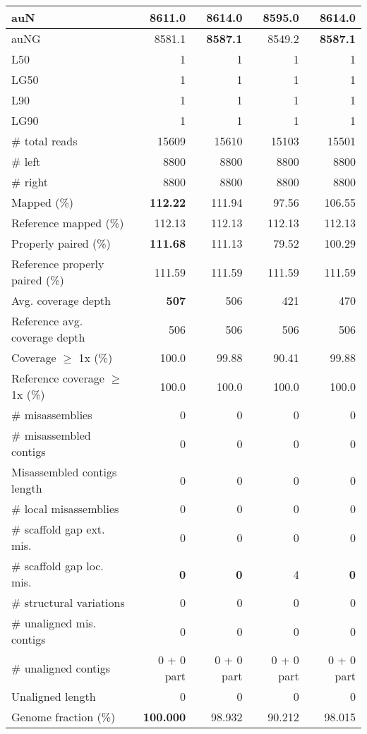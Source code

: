 \documentclass[12pt,a4paper]{article}
\begin{document}
\begin{table}[ht]
\begin{center}
\begin{tabular}{|l*{4}{|r}|}
auN & 8611.0 & {\bf 8614.0} & 8595.0 & {\bf 8614.0} \\ \hline
auNG & 8581.1 & {\bf 8587.1} & 8549.2 & {\bf 8587.1} \\ \hline
L50 & 1 & 1 & 1 & 1 \\ \hline
LG50 & 1 & 1 & 1 & 1 \\ \hline
L90 & 1 & 1 & 1 & 1 \\ \hline
LG90 & 1 & 1 & 1 & 1 \\ \hline
\# total reads & 15609 & 15610 & 15103 & 15501 \\ \hline
\# left & 8800 & 8800 & 8800 & 8800 \\ \hline
\# right & 8800 & 8800 & 8800 & 8800 \\ \hline
Mapped (\%) & {\bf 112.22} & 111.94 & 97.56 & 106.55 \\ \hline
Reference mapped (\%) & 112.13 & 112.13 & 112.13 & 112.13 \\ \hline
Properly paired (\%) & {\bf 111.68} & 111.13 & 79.52 & 100.29 \\ \hline
Reference properly paired (\%) & 111.59 & 111.59 & 111.59 & 111.59 \\ \hline
Avg. coverage depth & {\bf 507} & 506 & 421 & 470 \\ \hline
Reference avg. coverage depth & 506 & 506 & 506 & 506 \\ \hline
Coverage $\geq$ 1x (\%) & 100.0 & 99.88 & 90.41 & 99.88 \\ \hline
Reference coverage $\geq$ 1x (\%) & 100.0 & 100.0 & 100.0 & 100.0 \\ \hline
\# misassemblies & 0 & 0 & 0 & 0 \\ \hline
\# misassembled contigs & 0 & 0 & 0 & 0 \\ \hline
Misassembled contigs length & 0 & 0 & 0 & 0 \\ \hline
\# local misassemblies & 0 & 0 & 0 & 0 \\ \hline
\# scaffold gap ext. mis. & 0 & 0 & 0 & 0 \\ \hline
\# scaffold gap loc. mis. & {\bf 0} & {\bf 0} & 4 & {\bf 0} \\ \hline
\# structural variations & 0 & 0 & 0 & 0 \\ \hline
\# unaligned mis. contigs & 0 & 0 & 0 & 0 \\ \hline
\# unaligned contigs & 0 + 0 part & 0 + 0 part & 0 + 0 part & 0 + 0 part \\ \hline
Unaligned length & 0 & 0 & 0 & 0 \\ \hline
Genome fraction (\%) & {\bf 100.000} & 98.932 & 90.212 & 98.015 \\ \hline

\end{tabular}
\end{center}
\end{table}
\end{document}
